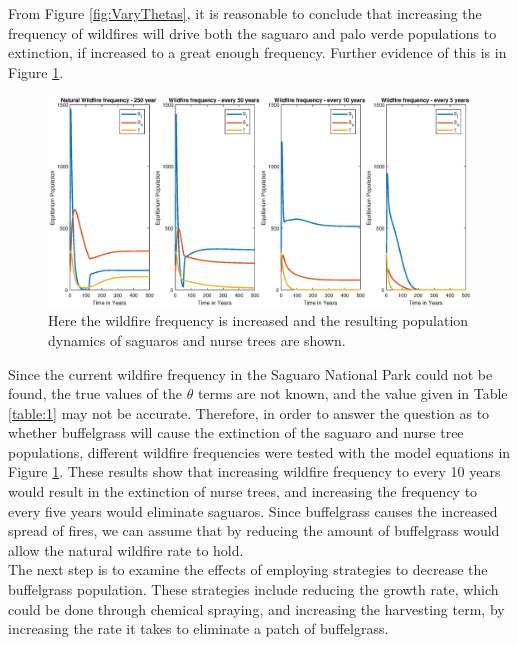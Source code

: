 \documentclass[a4paper]{article}
\begin{document}
From Figure \ref{fig:VaryThetas}, it is reasonable to conclude that increasing the frequency of wildfires will drive both the saguaro and palo verde populations to extinction, if increased to a great enough frequency. Further evidence of this is in Figure \ref{fig:MoreFire}.\\
\begin{figure}[H]
\includegraphics[scale = 0.4]{IncreasingWildfireFrequancy}
\caption{Here the wildfire frequency is increased and the resulting population dynamics of saguaros and nurse trees are shown.}
\label{fig:MoreFire}
\end{figure}
Since the current wildfire frequency in the Saguaro National Park could not be found, the true values of the $\theta$ terms are not known, and the value given in Table \ref{table:1} may not be accurate. Therefore, in order to answer the question as to whether buffelgrass will cause the extinction of the saguaro and nurse tree populations, different wildfire frequencies were tested with the model equations in Figure \ref{fig:MoreFire}. These results show that increasing wildfire frequency to every 10 years would result in the extinction of nurse trees, and increasing the frequency to every five years would eliminate saguaros. Since buffelgrass causes the increased spread of fires, we can assume that by reducing the amount of buffelgrass would allow the natural wildfire rate to hold.\\

The next step is to examine the effects of employing strategies to decrease the buffelgrass population. These strategies include reducing the growth rate, which could be done through chemical spraying, and increasing the harvesting term, by increasing the rate it takes to eliminate a patch of buffelgrass.
\end{document}
